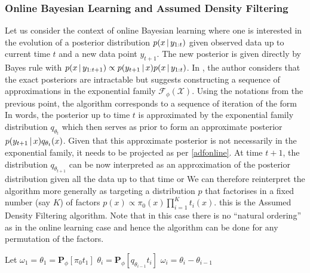 \subsubsection*{Online Bayesian Learning and Assumed Density Filtering}
%
Let us consider the context of online Bayesian learning where one is interested in the evolution of a posterior distribution $p(x\,|\, y_{1:t})$ given observed \iid{} data up to current time $t$ and a new data point $y_{t+1}$. The new posterior is given directly by Bayes rule with $p(x\,|\, y_{1:t+1})\propto p(y_{t+1}\,|\, x) p(x\,|\, y_{1:t})$. In \citet{opper98}, the author considers that the exact posteriors are intractable but suggests constructing a sequence of approximations in the exponential family $\mathcal F_{\phi}(\mathcal X)$. Using the notations from the previous point, the algorithm corresponds to a sequence of iteration of the form
In words, the posterior up to time $t$ is approximated by the exponential family distribution $q_{\theta_{t}}$ which then serves as prior to form an approximate posterior $p(y_{t+1}\,|\, x)q_{\theta_{t}}(x)$. Given that this approximate posterior is not necessarily in the exponential family, it needs to be projected as per \eqref{adfonline}. At time $t+1$, the distribution $q_{\theta_{t+1}}$ can be now interpreted as an approximation of the posterior distribution given all the data up to that time or 
%
%
We can therefore reinterpret the algorithm more generally as targeting a distribution $p$ that factorises in a fixed number (say $K$) of factors $p(x)\propto \pi_{0}(x)\prod_{i=1}^{K}t_{i}(x)$. this is the Assumed Density Filtering algorithm. Note that in this case there is no ``natural ordering'' as in the online learning case and hence the algorithm can be done for any permutation of the factors.
%
\begin{algorithm}[!h]\small
	\caption{\label{alg:adf}}
	\begin{algorithmic}[1]
	\State Let $\omega_{1}=\theta_{1}=\mathbf P_{\phi}[\pi_{0}t_{1}]$
		\State $\theta_{i}=\mathbf P_{\phi}[q_{\theta_{i-1}}t_{i}]$
		\State $\omega_{i} = \theta_{i}-\theta_{i-1}$
	\EndFor
	\end{algorithmic}
\end{algorithm} 

